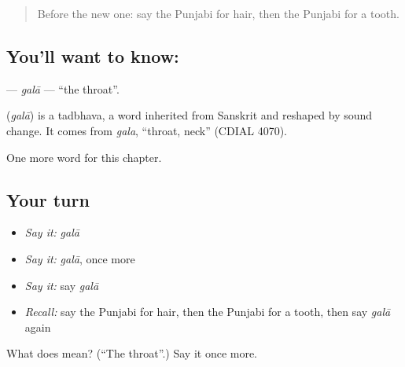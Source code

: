 \label{lesson:PA-C49-gala}



\begin{quote}
Before the new one: say the Punjabi for hair, then the Punjabi for a tooth.
\end{quote}

\subsection*{You'll want to know: }
\textbf{} — \emph{galā} — \textquotedblleft{}the throat\textquotedblright{}.

\begin{cousinweb}
\textbf{} (\emph{galā}) is a tadbhava, a word inherited from Sanskrit and reshaped by sound change. It comes from \emph{gala}, \textquotedblleft{}throat, neck\textquotedblright{} (CDIAL 4070).
\end{cousinweb}

\begin{grammarlens}[title={What you've built}]
One more word for this chapter.
\end{grammarlens}

\subsection*{Your turn}
\begin{itemize}
\raggedright
  \item \emph{Say it:} \emph{galā}
  \item \emph{Say it:} \emph{galā}, once more
  \item \emph{Say it:} say \emph{galā}
  \item \emph{Recall:} say the Punjabi for hair, then the Punjabi for a tooth, then say \emph{galā} again
\end{itemize}

\begin{tcolorbox}[breakable,colback=teal!4,colframe=teal!35!black,title={Before you move on}]
What does  mean? (\textquotedblleft{}The throat\textquotedblright{}.) Say it once more.
\end{tcolorbox}
